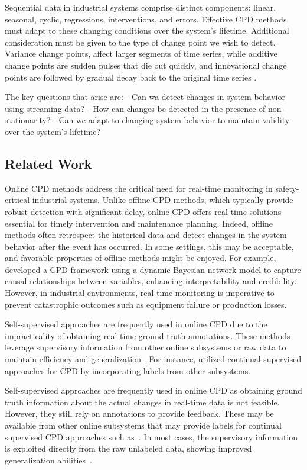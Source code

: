 Sequential data in industrial systems comprise distinct components: linear, seasonal, cyclic, regressions, interventions, and errors. Effective CPD methods must adapt to these changing conditions over the system's lifetime. Additional consideration must be given to the type of change point we wish to detect. Variance change points, affect larger segments of time series, while additive change points are sudden pulses that die out quickly, and innovational change points are followed by gradual decay back to the original time series \citep{Srivastava2017}.

The key questions that arise are:
- Can wa detect changes in system behavior using streaming data?
- How can changes be detected in the presence of non-stationarity?
- Can we adapt to changing system behavior to maintain validity over the system's lifetime?

\subsection{Related Work}
Online CPD methods address the critical need for real-time monitoring in safety-critical industrial systems. Unlike offline CPD methods, which typically provide robust detection with significant delay, online CPD offers real-time solutions essential for timely intervention and maintenance planning. Indeed, offline methods often retrospect the historical data and detect changes in the system behavior after the event has occurred. In some settings, this may be acceptable, and favorable properties of offline methods might be enjoyed. For example, \citet{Liu2022} developed a CPD framework using a dynamic Bayesian network model to capture causal relationships between variables, enhancing interpretability and credibility. However, in industrial environments, real-time monitoring is imperative to prevent catastrophic outcomes such as equipment failure or production losses.

Self-supervised approaches are frequently used in online CPD due to the impracticality of obtaining real-time ground truth annotations. These methods leverage supervisory information from other online subsystems or raw data to maintain efficiency and generalization \citep{Zhang2024}. For instance, \citet{Korycki2021} utilized continual supervised approaches for CPD by incorporating labels from other subsystems.

Self-supervised approaches are frequently used in online CPD as obtaining ground truth information about the actual changes in real-time data is not feasible. However, they still rely on annotations to provide feedback. These may be available from other online subsystems that may provide labels for continual supervised CPD approaches such as~\citep{Korycki2021}. In most cases, the supervisory information is exploited directly from the raw unlabeled data, showing improved generalization abilities~\citep{Zhang2024}.  %

